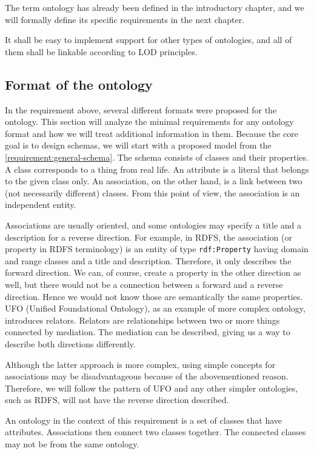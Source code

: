 The term ontology has already been defined in the introductory chapter, and we will formally define its specific requirements in the next chapter.

It shall be easy to implement support for other types of ontologies, and all of them shall be linkable according to LOD principles.

\subsection{Format of the ontology}

In the requirement above, several different formats were proposed for the ontology. This section will analyze the minimal requirements for any ontology format and how we will treat additional information in them. Because the core goal is to design schemas, we will start with a proposed model from the \autoref{requirement:general-schema}. The schema consists of classes and their properties. A class corresponds to a thing from real life. An attribute is a literal that belongs to the given class only. An association, on the other hand, is a link between two (not necessarily different) classes. From this point of view, the association is an independent entity.

Associations are usually oriented, and some ontologies may specify a title and a description for a reverse direction. For example, in RDFS, the association (or property in RDFS terminology) is an entity of type {\tt rdf:Property} having domain and range classes and a title and description. Therefore, it only describes the forward direction. We can, of course, create a property in the other direction as well, but there would not be a connection between a forward and a reverse direction. Hence we would not know those are semantically the same properties. UFO (Unified Foundational Ontology), as an example of more complex ontology, introduces relators. Relators are relationships between two or more things connected by mediation. The mediation can be described, giving us a way to describe both directions differently.

Although the latter approach is more complex, using simple concepts for associations may be disadvantageous because of the abovementioned reason. Therefore, we will follow the pattern of UFO and any other simpler ontologies, such as RDFS, will not have the reverse direction described.

\smallskip

An ontology in the context of this requirement is a set of classes that have attributes. Associations then connect two classes together. The connected classes may not be from the same ontology.


